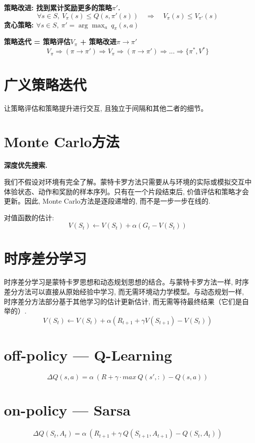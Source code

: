             \bf{策略改进}: 找到累计奖励更多的策略$\pi'$.
                $$\forall s \in S,\ V_\pi(s) \le Q(s, \pi'(s)) \quad \Rightarrow \quad V_\pi(s) \le V_{\pi'}(s)$$
                贪心策略: $\forall s \in S,\ \pi' = \arg\max_a\ q_\pi (s,a)$
                
            \bf{策略迭代} = 策略评估$V_{\pi}$ + 策略改进$\pi \to \pi'$
                $$V_{\pi} \Rightarrow (\pi \to \pi') \Rightarrow V_{\pi} \Rightarrow (\pi \to \pi') \Rightarrow ... \Rightarrow \{\pi^*, V^*\}$$
        
        \section{广义策略迭代}
            让策略评估和策略提升进行交互, 且独立于间隔和其他二者的细节。
    
    \section{Monte Carlo方法}
        \bf{深度优先搜索}.
    
        我们不假设对环境有完全了解。蒙特卡罗方法只需要从与环境的实际或模拟交互中体验状态、动作和奖励的样本序列。只有在一个片段结束后, 价值评估和策略才会更新。因此, Monte Carlo方法是逐段递增的, 而不是一步一步在线的.
        
        对值函数的估计:
            $$V\left(S_{t}\right) \leftarrow V\left(S_{t}\right)+\alpha\left(G_{t}-V\left(S_{t}\right)\right)$$

    \section{时序差分学习}
        时序差分学习是蒙特卡罗思想和动态规划思想的结合。与蒙特卡罗方法一样, 时序差分方法可以直接从原始经验中学习, 而无需环境动力学模型。与动态规划一样, 时序差分方法部分基于其他学习的估计更新估计, 而无需等待最终结果（它们是自举的）.
            $$V\left(S_{t}\right) \leftarrow V\left(S_{t}\right)+\alpha\left(R_{t+1}+\gamma V\left(S_{t+1}\right)-V\left(S_{t}\right)\right)$$
    
    	\section{off-policy --- Q-Learning}
    	    $$\Delta Q(s,a) = \alpha\ ( R + \gamma \cdot max\ Q(s',:) - Q(s,a))$$
    	    
    	\section{on-policy --- Sarsa}
    	    $$\Delta Q(S_{t},A_{t}) = \alpha\ ( R_{t+1} + \gamma\ Q(S_{t+1}, A_{t+1}) - Q(S_t, A_t))$$
    	
